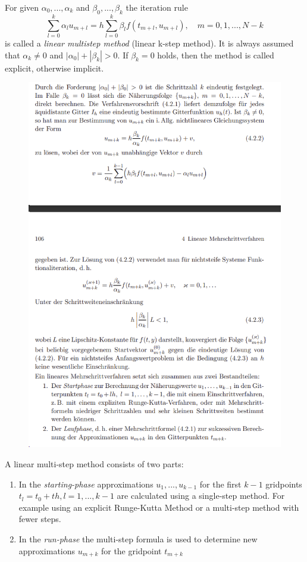 	\begin{definition}
		For given $\alpha_0, ..., \alpha_k$ and $\beta_0, ..., \beta_k$ the iteration rule
		\begin{equation}
			\label{linear-multistep-method}
			\sum_{l=0}^{k} \alpha_l u_{m+l} = h \sum_{l=0}^{k} \beta_l f(t_{m+l}, u_{m+l}), \quad m=0,1,...,N-k
		\end{equation}
		is called a \emph{linear multistep method} (linear k-step method). It is always assumed that $\alpha_k \neq 0$ and $|\alpha_0| + |\beta_k| > 0$. If $\beta_k=0$ holds, then the method is called explicit, otherwise implicit.
	\end{definition}
	
	\begin{figure}[H]
		\centering
		\includegraphics[width=0.7\linewidth]{screenshot010}
		\caption{}
		\label{fig:screenshot010}
	\end{figure}
	
	A linear multi-step method consists of two parts:
	\begin{enumerate}
		\item In the \emph{starting-phase} approximations $u_1,...,u_{k-1}$ for the first $k-1$ gridpoints $t_l = t_0+th, l=1,...,k-1$ are calculated using a single-step method. For example using an explicit Runge-Kutta Method or a multi-step method with fewer steps.
		
		\item  In the \emph{run-phase} the multi-step formula is used to determine new approximations $u_{m+k}$ for the gridpoint $t_{m+k}$
	\end{enumerate}
	
